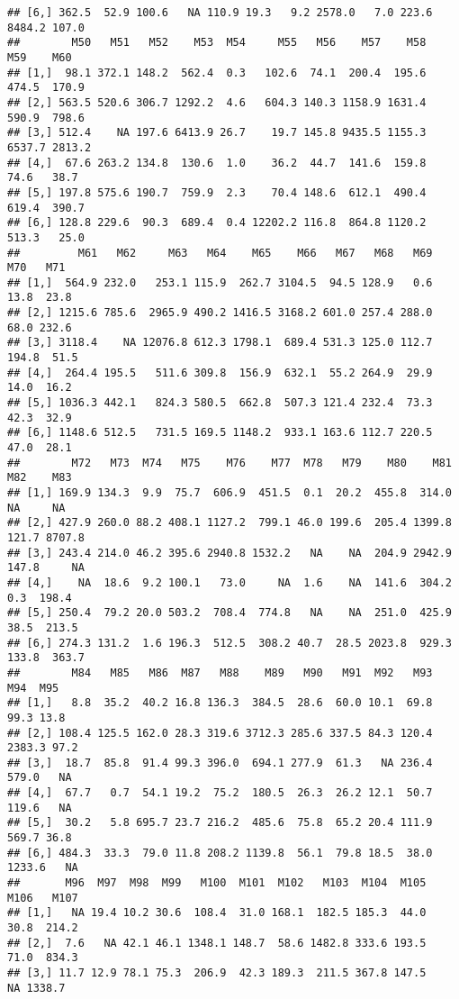 \documentclass[
]{article}
\begin{document}
\begin{verbatim}
## [6,] 362.5  52.9 100.6   NA 110.9 19.3   9.2 2578.0   7.0 223.6  8484.2 107.0
##        M50   M51   M52    M53  M54     M55   M56    M57    M58    M59    M60
## [1,]  98.1 372.1 148.2  562.4  0.3   102.6  74.1  200.4  195.6  474.5  170.9
## [2,] 563.5 520.6 306.7 1292.2  4.6   604.3 140.3 1158.9 1631.4  590.9  798.6
## [3,] 512.4    NA 197.6 6413.9 26.7    19.7 145.8 9435.5 1155.3 6537.7 2813.2
## [4,]  67.6 263.2 134.8  130.6  1.0    36.2  44.7  141.6  159.8   74.6   38.7
## [5,] 197.8 575.6 190.7  759.9  2.3    70.4 148.6  612.1  490.4  619.4  390.7
## [6,] 128.8 229.6  90.3  689.4  0.4 12202.2 116.8  864.8 1120.2  513.3   25.0
##         M61   M62     M63   M64    M65    M66   M67   M68   M69   M70   M71
## [1,]  564.9 232.0   253.1 115.9  262.7 3104.5  94.5 128.9   0.6  13.8  23.8
## [2,] 1215.6 785.6  2965.9 490.2 1416.5 3168.2 601.0 257.4 288.0  68.0 232.6
## [3,] 3118.4    NA 12076.8 612.3 1798.1  689.4 531.3 125.0 112.7 194.8  51.5
## [4,]  264.4 195.5   511.6 309.8  156.9  632.1  55.2 264.9  29.9  14.0  16.2
## [5,] 1036.3 442.1   824.3 580.5  662.8  507.3 121.4 232.4  73.3  42.3  32.9
## [6,] 1148.6 512.5   731.5 169.5 1148.2  933.1 163.6 112.7 220.5  47.0  28.1
##        M72   M73  M74   M75    M76    M77  M78   M79    M80    M81   M82    M83
## [1,] 169.9 134.3  9.9  75.7  606.9  451.5  0.1  20.2  455.8  314.0    NA     NA
## [2,] 427.9 260.0 88.2 408.1 1127.2  799.1 46.0 199.6  205.4 1399.8 121.7 8707.8
## [3,] 243.4 214.0 46.2 395.6 2940.8 1532.2   NA    NA  204.9 2942.9 147.8     NA
## [4,]    NA  18.6  9.2 100.1   73.0     NA  1.6    NA  141.6  304.2   0.3  198.4
## [5,] 250.4  79.2 20.0 503.2  708.4  774.8   NA    NA  251.0  425.9  38.5  213.5
## [6,] 274.3 131.2  1.6 196.3  512.5  308.2 40.7  28.5 2023.8  929.3 133.8  363.7
##        M84   M85   M86  M87   M88    M89   M90   M91  M92   M93    M94  M95
## [1,]   8.8  35.2  40.2 16.8 136.3  384.5  28.6  60.0 10.1  69.8   99.3 13.8
## [2,] 108.4 125.5 162.0 28.3 319.6 3712.3 285.6 337.5 84.3 120.4 2383.3 97.2
## [3,]  18.7  85.8  91.4 99.3 396.0  694.1 277.9  61.3   NA 236.4  579.0   NA
## [4,]  67.7   0.7  54.1 19.2  75.2  180.5  26.3  26.2 12.1  50.7  119.6   NA
## [5,]  30.2   5.8 695.7 23.7 216.2  485.6  75.8  65.2 20.4 111.9  569.7 36.8
## [6,] 484.3  33.3  79.0 11.8 208.2 1139.8  56.1  79.8 18.5  38.0 1233.6   NA
##       M96  M97  M98  M99   M100  M101  M102   M103  M104  M105  M106   M107
## [1,]   NA 19.4 10.2 30.6  108.4  31.0 168.1  182.5 185.3  44.0  30.8  214.2
## [2,]  7.6   NA 42.1 46.1 1348.1 148.7  58.6 1482.8 333.6 193.5  71.0  834.3
## [3,] 11.7 12.9 78.1 75.3  206.9  42.3 189.3  211.5 367.8 147.5    NA 1338.7

\end{verbatim}
\end{document}
